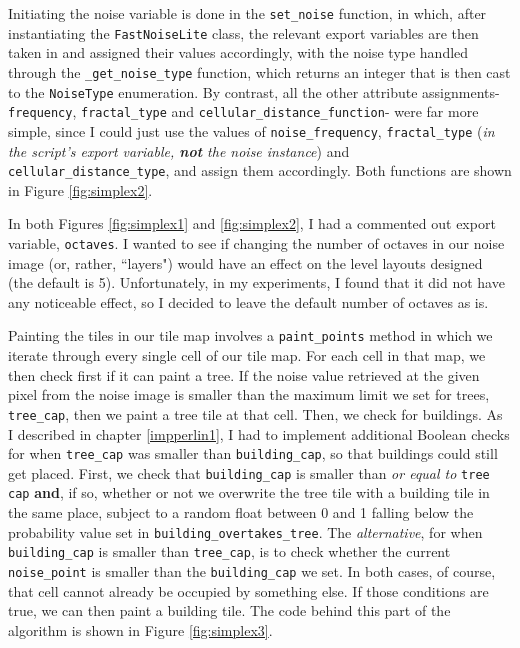 Initiating the noise variable is done in the \verb|set_noise| function, in which, after instantiating the \verb|FastNoiseLite| class, the relevant export variables are then taken in and assigned their values accordingly, with the noise type handled through the \verb|_get_noise_type| function, which returns an integer that is then cast to the \verb|NoiseType| enumeration. By contrast, all the other attribute assignments- \verb|frequency|, \verb|fractal_type| and \verb|cellular_distance_function|- were far more simple, since I could just use the values of \verb|noise_frequency|, \verb|fractal_type| (\textit{in the script's export variable, \textbf{not} the noise instance}) and \verb|cellular_distance_type|, and assign them accordingly. Both functions are shown in Figure \ref{fig:simplex2}.

In both Figures \ref{fig:simplex1} and \ref{fig:simplex2}, I had a commented out export variable, \verb|octaves|. I wanted to see if changing the number of octaves in our noise image (or, rather, ``layers") would have an effect on the level layouts designed (the default is 5\cite{fastnoiselitedocs}). Unfortunately, in my experiments, I found that it did not have any noticeable effect, so I decided to leave the default number of octaves as is. 

Painting the tiles in our tile map involves a \verb|paint_points| method in which we iterate through every single cell of our tile map. For each cell in that map, we then check first if it can paint a tree. If the noise value retrieved at the given pixel from the noise image is smaller than the maximum limit we set for trees, \verb|tree_cap|, then we paint a tree tile at that cell. Then, we check for buildings. As I described in chapter \ref{impperlin1}, I had to implement additional Boolean checks for when \verb|tree_cap| was smaller than \verb|building_cap|, so that buildings could still get placed. First, we check that \verb|building_cap| is smaller than \textit{or equal to} \verb|tree cap| \textbf{and}, if so, whether or not we overwrite the tree tile with a building tile in the same place, subject to a random float between 0 and 1 falling below the probability value set in \verb|building_overtakes_tree|. The \textit{alternative}, for when \verb|building_cap| is smaller than \verb|tree_cap|, is to check whether the current \verb|noise_point| is smaller than the \verb|building_cap| we set. In both cases, of course, that cell cannot already be occupied by something else. If those conditions are true, we can then paint a building tile. The code behind this part of the algorithm is shown in Figure \ref{fig:simplex3}.

